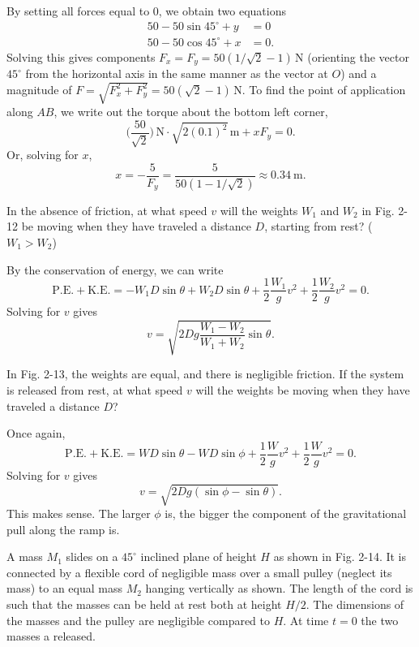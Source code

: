 \documentclass[../feynman-lectures-on-physics.tex]{subfiles}
\begin{document}
\begin{questions}
\begin{solution}
	By setting all forces equal to $0$, we obtain two equations
	\begin{align}
		50 - 50\sin{45^\circ} + y &= 0 \\
		50 - 50\cos{45^\circ} + x &= 0.
	\end{align}
	Solving this gives components $F_x = F_y = 50(1/\sqrt{2} - 1)\,\si{\newton}$ (orienting the vector $45^\circ$ from the horizontal axis in the same manner as the vector at $O$) and a magnitude of $F=\sqrt{F_x^2 + F_y^2} = 50(\sqrt{2} - 1)\,\si{\newton}$. To find the point of application along $AB$, we write out the torque about the bottom left corner,
	\[
	\Big(\frac{50}{\sqrt{2}}\Big)\,\si{\newton}\cdot\sqrt{2(0.1)^2}\,\si{\meter} + xF_y = 0.
	\] 
	Or, solving for $x$,
	\[
	x = -\frac{5}{F_y} = \frac{5}{50(1 - 1/\sqrt{2})} \approx \SI{0.34}{\meter}.
	\] 
\end{solution}

\question In the absence of friction, at what speed $v$ will the weights $W_1$ and $W_2$ in Fig. 2-12 be moving when they have traveled a distance $D$, starting from rest? ($W_1 > W_2$)

\begin{solution}
	By the conservation of energy, we can write
	\[
	\mathrm{P.E.} + \mathrm{K.E.} = -W_1D\sin\theta + W_2D\sin\theta + \frac{1}{2}\frac{W_1}{g}v^2 + \frac{1}{2}\frac{W_2}{g}v^2 = 0
	.\] 
	Solving for $v$ gives
	\[
	v = \sqrt{2Dg\frac{W_1 - W_2}{W_1 + W_2}\sin\theta}
	.\] 
\end{solution}

\question In Fig. 2-13, the weights are equal, and there is negligible friction. If the system is released from rest, at what speed $v$ will the weights be moving when they have traveled a distance $D$?

\begin{solution}
	Once again,
	\[
	\mathrm{P.E.} + \mathrm{K.E.} = WD\sin\theta - WD\sin\phi + \frac{1}{2}\frac{W}{g}v^2 + \frac{1}{2}\frac{W}{g}v^2 = 0.
	\] 
	Solving for $v$ gives
	\[
	v = \sqrt{2Dg(\sin\phi - \sin\theta)}.
	\] 
	This makes sense. The larger $\phi$ is, the bigger the component of the gravitational pull along the ramp is.
\end{solution}

\question A mass $M_1$ slides on a $45^\circ$ inclined plane of height $H$ as shown in Fig. 2-14. It is connected by a flexible cord of negligible mass over a small pulley (neglect its mass) to an equal mass $M_2$ hanging vertically as shown. The length of the cord is such that the masses can be held at rest both at height $H/2$. The dimensions of the masses and the pulley are negligible compared to $H$. At time $t=0$ the two masses a released.
\begin{parts}

\end{parts}
\end{questions}
\end{document}
